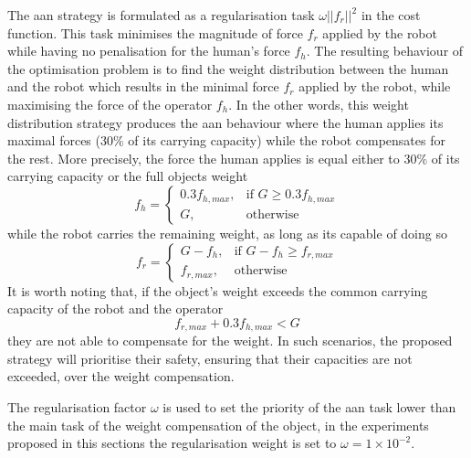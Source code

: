 The \gls{aan} strategy is formulated as a regularisation task $\omega||f_r||^2$ in the cost function. This task minimises the magnitude of force $f_{r}$ applied by the robot while having no penalisation for the human's force $f_h$. The resulting behaviour of the optimisation problem is to find the weight distribution between the human and the robot which results in the minimal force $f_{r}$ applied by the robot, while maximising the force of the operator $f_h$. In the other words, this weight distribution strategy produces the \gls{aan} behaviour where the human applies its maximal forces (30\% of its carrying capacity) while the robot compensates for the rest. More precisely, the force the human applies is equal either to 30\% of its carrying capacity or the full objects weight
$$
f_h = \begin{cases}
    0.3f_{h,max},& \text{if } G\geq 0.3f_{h,max}\\
    G,              & \text{otherwise}
\end{cases}
$$
while the robot carries the remaining weight, as long as its capable of doing so
$$
f_r =  \begin{cases}
    G-f_h,& \text{if } G-f_h\geq f_{r,max}\\
    f_{r,max},              & \text{otherwise}
\end{cases}
$$
It is worth noting that, if the object's weight exceeds the common carrying capacity of the robot and the operator $$f_{r,max} + 0.3f_{h,max} < G$$
they are not able to compensate for the weight. In such scenarios, the proposed strategy will prioritise their safety, ensuring that their capacities are not exceeded, over the weight compensation.

The regularisation factor $\omega$ is used to set the priority of the \gls{aan} task lower than the main task of the weight compensation of the object, in the experiments proposed in this sections the regularisation weight is set to $\omega=1\times 10^{-2}$.


